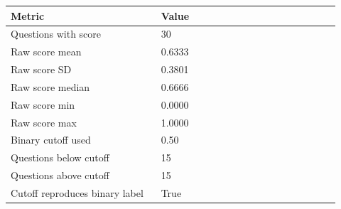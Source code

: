 \begin{tabular}{p{0.42\linewidth}p{0.50\linewidth}}
\toprule
Metric & Value\\
\midrule
Questions with score & 30\\
Raw score mean & 0.6333\\
Raw score SD & 0.3801\\
Raw score median & 0.6666\\
Raw score min & 0.0000\\
Raw score max & 1.0000\\
Binary cutoff used & 0.50\\
Questions below cutoff & 15\\
Questions above cutoff & 15\\
Cutoff reproduces binary label & True\\
\bottomrule
\end{tabular}
